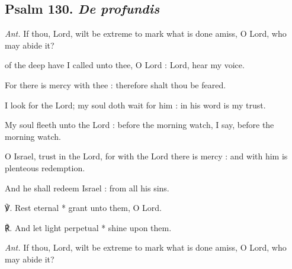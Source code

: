 \vspace{-1ex}
\subsection{Psalm 130. \textit{De profundis}}\noindent
\textit{Ant.} If thou, Lord, wilt be extreme {\dag} to mark what is done amiss, O Lord, who may abide it?\par
{} of the deep have I called unto thee, O Lord : Lord, hear my voice.\par
{}
For there is mercy with thee : therefore shalt thou be feared.\par
{}I look for the Lord; my soul doth wait for him : in his word is my trust.\par
{}My soul fleeth unto the Lord : before the morning watch, I say, before the morning watch.\par
{}O Israel, trust in the Lord, for with the Lord there is mercy : and with him is plenteous redemption.\par
{}And he shall redeem Israel : from all his sins.\par
℣. Rest eternal * grant unto them, O Lord.\par
℟. And let light perpetual * shine upon them.\par\noindent
\textit{Ant.} If thou, Lord, wilt be extreme to mark what is done amiss, O Lord, who may abide it?
